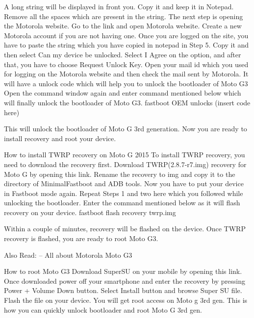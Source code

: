 A long string will be displayed in front you. Copy it and keep it in Notepad. Remove all the spaces which are present in the string.
The next step is opening the Motorola website. Go to the link and open Motorola website.
Create a new Motorola account if you are not having one. Once you are logged on the site, you have to paste the string which you have copied in notepad in Step 5.
Copy it and then select Can my device be unlocked. Select I Agree on the option, and after that, you have to choose Request Unlock Key.
Open your mail id which you used for logging on the Motorola website and then check the mail sent by Motorola. It will have a unlock code which will help you to unlock the bootloader of Moto G3
Open the command window again and enter command mentioned below which will finally unlock the bootloader of Moto G3.
fastboot OEM unlocks (insert code here)

This will unlock the bootloader of Moto G 3rd generation. Now you are ready to install recovery and root your device.

How to install TWRP recovery on Moto G 2015
To install TWRP recovery, you need to download the recovery first.
Download TWRP(2.8.7-r7.img) recovery for Moto G by opening this link. Rename the recovery to img and copy it to the directory of MinimalFastboot and ADB tools.
Now you have to put your device in Fastboot mode again. Repeat Steps 1 and two here which you followed while unlocking the bootloader.
Enter the command mentioned below as it will flash recovery on your device.
fastboot flash recovery twrp.img

Within a couple of minutes, recovery will be flashed on the device.
Once TWRP recovery is flashed, you are ready to root  Moto G3.

Also Read: – All about Motorola Moto G3

How to root Moto G3
Download SuperSU on your mobile by opening this link.
Once downloaded power off your smartphone and enter the recovery by pressing Power + Volume Down button.
Select Install button and browse Super SU file.
Flash the file on your device.
You will get root access on Moto g 3rd gen. This is how you can quickly unlock bootloader and root Moto G 3rd gen.

